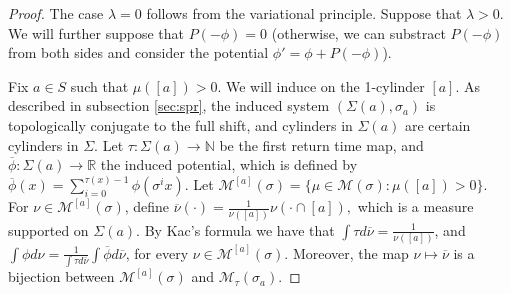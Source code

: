 \documentclass[letterpaper,11pt]{amsart}
\theoremstyle{plain}
\theoremstyle{plain}
\theoremstyle{definition}
\theoremstyle{remark}
\def\R{{\mathbb R}}
\def\N{{\mathbb N}}
\def\M{{\mathcal M}}
\begin{document}
\begin{proof} 

The case $\lambda=0$ follows from the variational principle. Suppose that  $\lambda>0$. We will further suppose that  $P(-\phi)=0$ (otherwise, we can substract $P(-\phi)$ from both sides and consider the potential $\phi'=\phi+P(-\phi)$).

 Fix  $a\in S$ such that $\mu([a])>0$. We will induce on the 1-cylinder $[a]$. As described in subsection \ref{sec:spr}, the induced system $(\Sigma(a),\sigma_a)$ is topologically conjugate to the full shift, and cylinders in $\Sigma(a)$ are certain cylinders in $\Sigma$. Let $\tau:\Sigma(a)\to\N$ be the first return time map, and  $\overline{\phi}:\Sigma(a)\to\R$ the induced potential, which is defined by $\overline{\phi}(x)=\sum_{i=0}^{\tau(x)-1}\phi(\sigma^i x)$. Let $\M^{[a]}(\sigma)=\{\mu\in \M(\sigma): \mu([a])>0\}$. For $\nu\in\M^{[a]}(\sigma)$, define $\overline{\nu}(\cdot)=\frac{1}{\nu([a])}\nu(\cdot\cap [a]),$ which is a measure supported on $\Sigma(a)$. By Kac's formula we have that $\int \tau d\overline{\nu}=\frac{1}{\nu([a])}$, and $\int \phi d\nu=\frac{1}{\int \tau d\overline{\nu}}\int \overline{\phi} d\overline{\nu}$, for every $\nu\in \M^{[a]}(\sigma)$. Moreover, the  map $\nu\mapsto \overline{\nu}$ is a bijection between $\M^{[a]}(\sigma)$ and $\M_\tau(\sigma_a)$.


\end{proof}
\end{document}
